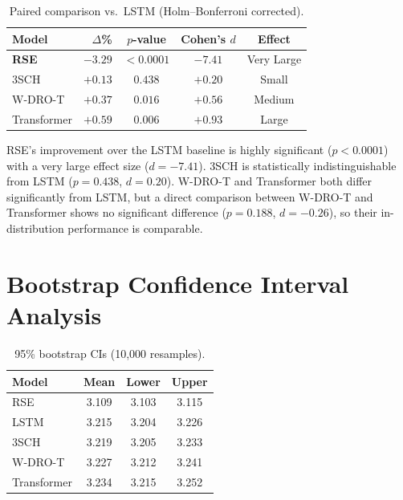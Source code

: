 \documentclass[11pt,oneside]{report}
\begin{document}
\begin{table}[H]
\centering\small
\caption{Paired comparison vs.\ LSTM (Holm--Bonferroni corrected).}
\label{tab:paired}
\begin{tabular}{@{}lrccc@{}}
\toprule
\textbf{Model} & \textbf{$\Delta$\%} & \textbf{$p$-value} & \textbf{Cohen's $d$} & \textbf{Effect} \\\midrule
\textbf{RSE} & $-3.29$ & $< 0.0001$ & $-7.41$ & Very Large \\
3SCH & $+0.13$ & $0.438$ & $+0.20$ & Small \\
W-DRO-T & $+0.37$ & $0.016$ & $+0.56$ & Medium\\
Transformer & $+0.59$ & $0.006$ & $+0.93$ & Large\\
\bottomrule
\end{tabular}
\end{table}

RSE’s improvement over the LSTM baseline is highly significant ($p < 0.0001$) with a very large effect size ($d = -7.41$). 3SCH is statistically indistinguishable from LSTM ($p = 0.438$, $d = 0.20$). W-DRO-T and Transformer both differ significantly from LSTM, but a direct comparison between W-DRO-T and Transformer shows no significant difference ($p = 0.188$, $d = -0.26$), so their in-distribution performance is comparable.

\section{Bootstrap Confidence Interval Analysis}

\begin{table}[H]
\centering\small
\caption{95\% bootstrap CIs (10,000 resamples).}
\label{tab:bootstrap}
\begin{tabular}{@{}lccc@{}}
\toprule
\textbf{Model} & \textbf{Mean} & \textbf{Lower} & \textbf{Upper} \\\midrule
RSE & 3.109 & 3.103 & 3.115 \\
LSTM & 3.215 & 3.204 & 3.226 \\
3SCH & 3.219 & 3.205 & 3.233 \\
W-DRO-T & 3.227 & 3.212 & 3.241 \\
Transformer & 3.234 & 3.215 & 3.252 \\
\bottomrule
\end{tabular}
\end{table}
\end{document}
